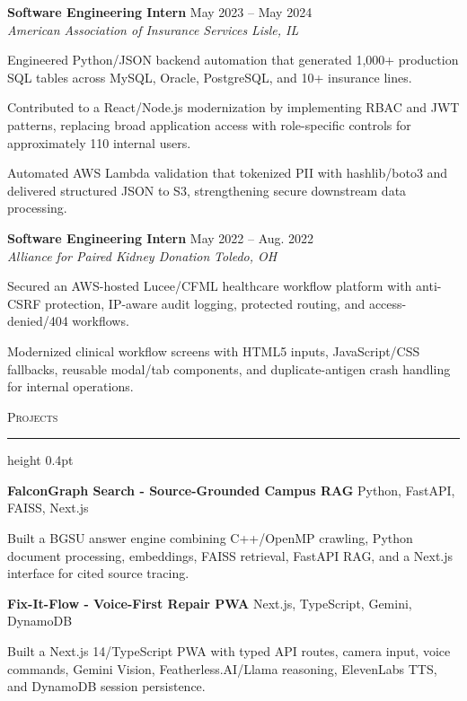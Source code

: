 \documentclass[letterpaper,11pt]{article}
\newcommand{\resumesection}[1]{%
  \par\vspace{2pt}%
  {\large\scshape #1}\par\vspace{2pt}%
  \hrule height 0.4pt\vspace{2pt}%
}
\newcommand{\resumeSubheading}[4]{
  \textbf{#1} \hfill #2\\
  \textit{#3} \hfill \textit{#4}
}
\newcommand{\projectHeading}[2]{
  \textbf{#1} \hfill #2
}
\begin{document}
\resumeSubheading
{Software Engineering Intern}{May 2023 -- May 2024}
{American Association of Insurance Services}{Lisle, IL}
\begin{tightitemize}
  \item Engineered Python/JSON backend automation that generated 1,000+ production SQL tables across MySQL, Oracle, PostgreSQL, and 10+ insurance lines.
  \item Contributed to a React/Node.js modernization by implementing RBAC and JWT patterns, replacing broad application access with role-specific controls for approximately 110 internal users.
  \item Automated AWS Lambda validation that tokenized PII with hashlib/boto3 and delivered structured JSON to S3, strengthening secure downstream data processing.
\end{tightitemize}

\resumeSubheading
{Software Engineering Intern}{May 2022 -- Aug. 2022}
{Alliance for Paired Kidney Donation}{Toledo, OH}
\begin{tightitemize}
  \item Secured an AWS-hosted Lucee/CFML healthcare workflow platform with anti-CSRF protection, IP-aware audit logging, protected routing, and access-denied/404 workflows.
  \item Modernized clinical workflow screens with HTML5 inputs, JavaScript/CSS fallbacks, reusable modal/tab components, and duplicate-antigen crash handling for internal operations.
\end{tightitemize}

\resumesection{Projects}
\projectHeading{FalconGraph Search - Source-Grounded Campus RAG}{Python, FastAPI, FAISS, Next.js}
\begin{tightitemize}
  \item Built a BGSU answer engine combining C++/OpenMP crawling, Python document processing, embeddings, FAISS retrieval, FastAPI RAG, and a Next.js interface for cited source tracing.
\end{tightitemize}

\projectHeading{Fix-It-Flow - Voice-First Repair PWA}{Next.js, TypeScript, Gemini, DynamoDB}
\begin{tightitemize}
  \item Built a Next.js 14/TypeScript PWA with typed API routes, camera input, voice commands, Gemini Vision, Featherless.AI/Llama reasoning, ElevenLabs TTS, and DynamoDB session persistence.
\end{tightitemize}
\end{document}
